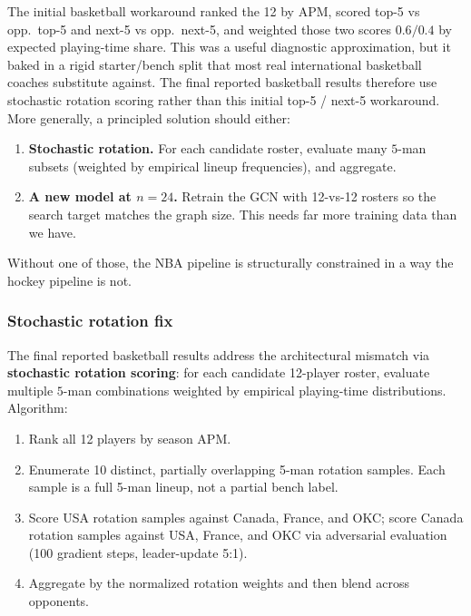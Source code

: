 \documentclass[11pt,letterpaper]{article}
\begin{document}
The initial basketball workaround ranked the 12 by APM, scored top-5
vs opp.\ top-5 and next-5 vs opp.\ next-5, and weighted those two
scores $0.6/0.4$ by expected playing-time share. This was a useful
diagnostic approximation, but it baked in a rigid starter/bench split
that most real international basketball coaches substitute against. The final reported
basketball results therefore use stochastic rotation scoring rather
than this initial top-5 / next-5 workaround. More generally, a
principled solution should either:

\begin{enumerate}[leftmargin=*]
  \item \textbf{Stochastic rotation.} For each candidate roster,
    evaluate many $5$-man subsets (weighted by empirical lineup
    frequencies), and aggregate.
  \item \textbf{A new model at $n = 24$.} Retrain the GCN with 12-vs-12
    rosters so the search target matches the graph size. This needs
    far more training data than we have.
\end{enumerate}

Without one of those, the NBA pipeline is structurally constrained in
a way the hockey pipeline is not.

\subsubsection{Stochastic rotation fix}

The final reported basketball results address the architectural
mismatch via \textbf{stochastic rotation scoring}: for each candidate
12-player roster, evaluate multiple $5$-man combinations weighted by
empirical playing-time distributions.
Algorithm:

\begin{enumerate}[leftmargin=*]
  \item Rank all 12 players by season APM.
  \item Enumerate 10 distinct, partially overlapping 5-man rotation
    samples. Each sample is a full 5-man lineup, not a partial bench
    label.
  \item Score USA rotation samples against Canada, France, and OKC;
    score Canada rotation samples against USA, France, and OKC via
    adversarial evaluation (100 gradient steps, leader-update 5:1).
  \item Aggregate by the normalized rotation weights and then blend
    across opponents.
\end{enumerate}
\end{document}

